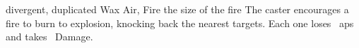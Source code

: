   {divergent, duplicated}%
  {Wax}%
  {Air, Fire}%
  {the size of the fire}%
  {%
    The caster encourages a fire to burn to explosion, knocking back the nearest  targets.
    Each one loses ~\glspl{ap} and takes ~Damage.
  }%
  {}

